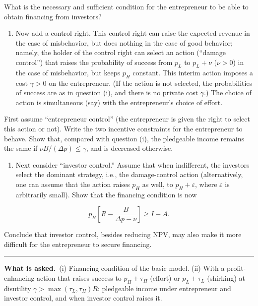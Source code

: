 \documentclass[11pt,a4paper]{article}
\newcommand{\asked}{\par\medskip\noindent\textbf{What is asked.}~}
\providecommand{\tightlist}{\setlength{\itemsep}{0pt}\setlength{\parskip}{0pt}}
\newcommand{\stmtend}{\par\endgroup\nopagebreak\noindent\rule{\linewidth}{0.4pt}\par\medskip}
\begin{document}
What is the necessary and sufficient condition for the entrepreneur to be able to obtain financing
from investors?

\begin{enumerate}
\def\labelenumi{(\roman{enumi})}
\setcounter{enumi}{1}
\tightlist
\item
  Now add a control right. This control right can raise the expected revenue in the case of
  misbehavior, but does nothing in the case of good behavior; namely, the holder of the control
  right can select an action (``damage control'') that raises the probability of success from
  \(p_L\) to \(p_L + \nu\) (\(\nu > 0\)) in the case of misbehavior, but keeps \(p_H\) constant.
  This interim action imposes a cost \(\gamma > 0\) on the entrepreneur. (If the action is not
  selected, the probabilities of success are as in question (i), and there is no private cost
  \(\gamma\).) The choice of action is simultaneous (say) with the entrepreneur's choice of effort.
\end{enumerate}

First assume ``entrepreneur control'' (the entrepreneur is given the right to select this action or
not). Write the two incentive constraints for the entrepreneur to behave. Show that, compared with
question (i), the pledgeable income remains the same if \(\nu B/(\Delta p) \leqslant \gamma\), and
is decreased otherwise.

\begin{enumerate}
\def\labelenumi{(\roman{enumi})}
\setcounter{enumi}{2}
\tightlist
\item
  Next consider ``investor control.'' Assume that when indifferent, the investors select the
  dominant strategy, i.e., the damage-control action (alternatively, one can assume that the action
  raises \(p_H\) as well, to \(p_H + \varepsilon\), where \(\varepsilon\) is arbitrarily small).
  Show that the financing condition is now
\end{enumerate}

\[p_H\left[R - \frac{B}{\Delta p - \nu}\right] \geqslant I - A.\]

Conclude that investor control, besides reducing NPV, may also make it more difficult for the
entrepreneur to secure financing.
\stmtend

\asked (i) Financing condition of the basic model. (ii) With a profit-enhancing action that raises success to $p_H+\tau_H$ (effort) or $p_L+\tau_L$ (shirking) at disutility $\gamma>\max(\tau_L,\tau_H)R$: pledgeable income under entrepreneur and investor control, and when investor control raises it.
\end{document}

